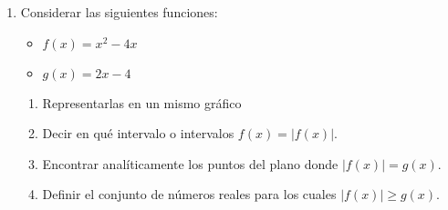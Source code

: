 \documentclass[12pt]{article}
\theoremstyle{definition}
\begin{document}
\begin{enumerate}
\item  
Considerar las siguientes  funciones:
	\begin{itemize}
		\item  $f(x) = x^2-4x$
		\item  $g(x) =2x-4$
	\end{itemize}
\begin{enumerate}
	\item Representarlas en un mismo gráfico
	\item Decir en qué intervalo o intervalos $f(x) = |f(x)|$.
	\item Encontrar analíticamente los puntos del plano donde  $|f(x)| = g(x)$.
	\item Definir el conjunto de números reales para los cuales $|f(x)|\geq g(x)$.
\end{enumerate}
\end{enumerate}
\end{document}

